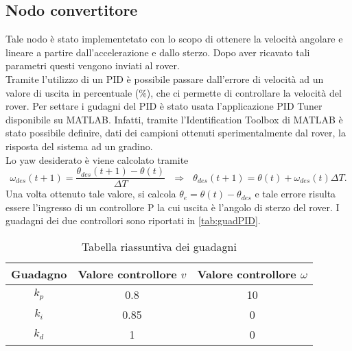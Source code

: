 \subsection{Nodo convertitore}
Tale nodo è stato implementetato con lo scopo di ottenere la velocità angolare e lineare a partire dall'accelerazione e dallo sterzo. Dopo aver ricavato tali parametri questi vengono inviati al rover.\\
Tramite l'utilizzo di un PID è possibile passare dall'errore di velocità ad un valore di uscita in percentuale (\%), che ci permette di controllare la velocità del rover. Per settare i gudagni del PID è stato usata l'applicazione PID Tuner disponibile su MATLAB. Infatti, tramite l'Identification Toolbox di MATLAB è stato possibile definire, dati dei campioni ottenuti sperimentalmente dal rover, la risposta del sistema ad un gradino.\\
Lo yaw desiderato è viene calcolato tramite
\begin{equation}
\omega_{des}(t+1)=\frac{\theta_{des}(t+1)-\theta(t)}{\Delta{T}} \ \ \
\Rightarrow \ \ \ \theta_{des}(t+1)=\theta(t)+\omega_{des}(t)\Delta{T}.
\end{equation} 
Una volta ottenuto tale valore, si calcola $ \theta_e = \theta(t) - \theta_{des} $ e tale errore risulta essere l'ingresso di un controllore P la cui uscita è l'angolo di sterzo del rover.
I guadagni dei due controllori sono riportati in \autoref{tab:guadPID}.
\begin{table} [H]
    \centering
    \begin{tabular}{|ccc|}
    \hline
        Guadagno & Valore controllore $v$ & Valore controllore $\omega$ \\  \hline
        $k_p$ & 0.8  & 10\\  \hline
        $k_i$ & 0.85 & 0 \\  \hline
        $k_d$ & 1    & 0 \\  \hline
    \end{tabular}
    \caption{Tabella riassuntiva dei guadagni}
    \label{tab:guadPID}    
\end{table}





